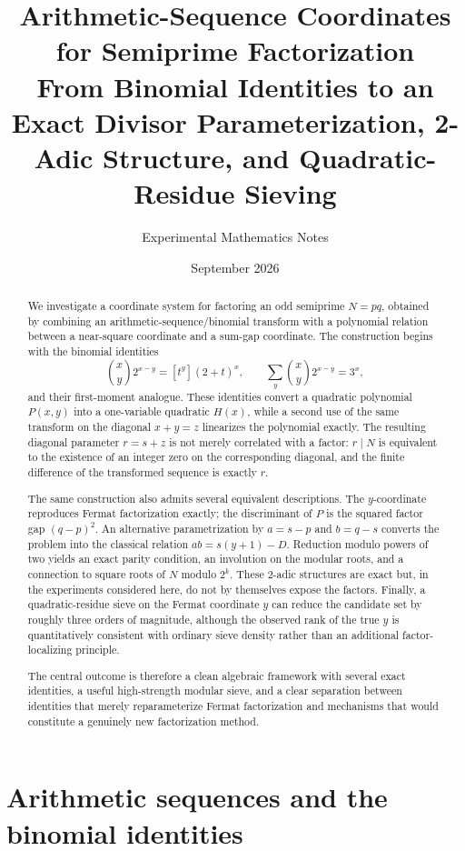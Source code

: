 \documentclass[11pt,a4paper]{article}
\title{\textbf{Arithmetic-Sequence Coordinates for Semiprime Factorization}\\
\large From Binomial Identities to an Exact Divisor Parameterization, 2-Adic Structure, and Quadratic-Residue Sieving}
\author{Experimental Mathematics Notes}
\date{September 2026}
\begin{document}
\maketitle
\begin{abstract}
We investigate a coordinate system for factoring an odd semiprime \(N=pq\), obtained by combining an arithmetic-sequence/binomial transform with a polynomial relation between a near-square coordinate and a sum-gap coordinate. The construction begins with the binomial identities
\[
\binom{x}{y}2^{x-y}=[t^y](2+t)^x,\qquad
\sum_y\binom{x}{y}2^{x-y}=3^x,
\]
and their first-moment analogue. These identities convert a quadratic polynomial \(P(x,y)\) into a one-variable quadratic \(H(x)\), while a second use of the same transform on the diagonal \(x+y=z\) linearizes the polynomial exactly. The resulting diagonal parameter \(r=s+z\) is not merely correlated with a factor: \(r\mid N\) is equivalent to the existence of an integer zero on the corresponding diagonal, and the finite difference of the transformed sequence is exactly \(r\).

The same construction also admits several equivalent descriptions. The \(y\)-coordinate reproduces Fermat factorization exactly; the discriminant of \(P\) is the squared factor gap \((q-p)^2\). An alternative parametrization by \(a=s-p\) and \(b=q-s\) converts the problem into the classical relation \(ab=s(y+1)-D\). Reduction modulo powers of two yields an exact parity condition, an involution on the modular roots, and a connection to square roots of \(N\) modulo \(2^k\). These 2-adic structures are exact but, in the experiments considered here, do not by themselves expose the factors. Finally, a quadratic-residue sieve on the Fermat coordinate \(y\) can reduce the candidate set by roughly three orders of magnitude, although the observed rank of the true \(y\) is quantitatively consistent with ordinary sieve density rather than an additional factor-localizing principle.

The central outcome is therefore a clean algebraic framework with several exact identities, a useful high-strength modular sieve, and a clear separation between identities that merely reparameterize Fermat factorization and mechanisms that would constitute a genuinely new factorization method.
\end{abstract}

\tableofcontents
\newpage

\section{Arithmetic sequences and the binomial identities}
\label{sec:arithmetic}
\end{document}
